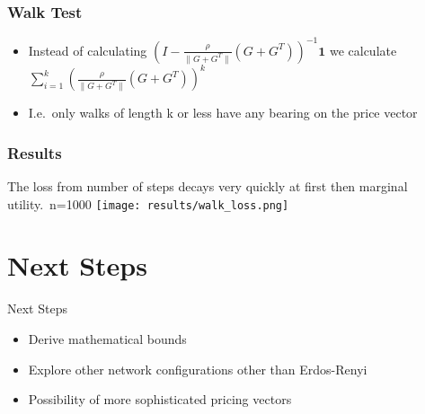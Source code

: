 \documentclass[a4paper,12pt]{beamer}
\begin{document}
\begin{frame}
  \frametitle{Walk Test}
  \begin{itemize}
    \item Instead of calculating ${(I - \frac{\rho}{\| G + G^{T}\|}(G+G^{T}) )}^{-1} \textbf{1}$ we calculate $\sum_{i=1}^{k} {( \frac{\rho}{\|G+G^{T}\|} (G+G^{T}) )}^{k}$ \\
    \item I.e.\ only walks of length k or less have any bearing on the price vector \\
  \end{itemize}
\end{frame}

\begin{frame}
  \frametitle{Results}
  The loss from number of steps decays very quickly at first then marginal utility.\ n=1000
  \texttt{[image: results/walk\_loss.png]}
\end{frame}

\section{Next Steps}
\begin{frame}{Next Steps}
  \begin{itemize}
    \item Derive mathematical bounds \\
    \item Explore other network configurations other than Erdos-Renyi \
    \item Possibility of more sophisticated pricing vectors
  \end{itemize}
\end{frame}



\end{document}
